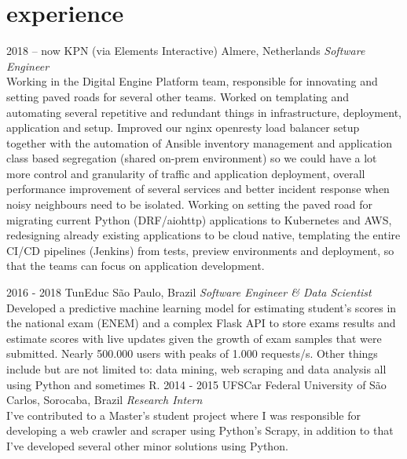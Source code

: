 \documentclass[]{friggeri-cv}
\begin{document}
\section{experience}

\begin{entrylist}
	\entry
		{2018 -- now}
		{KPN (via Elements Interactive)}
		{Almere, Netherlands}
		{\emph{Software Engineer}\\
		Working in the Digital Engine Platform team, responsible for innovating and setting paved roads for several other teams. Worked on templating and automating several repetitive and redundant things in infrastructure, deployment, application and setup.
		Improved our nginx openresty load balancer setup together with the automation of Ansible inventory management and application class based segregation (shared on-prem environment) so we could have a lot more control and granularity of traffic and application deployment, overall performance improvement of several services and better incident response when noisy neighbours need to be isolated.
		Working on setting the paved road for migrating current Python (DRF/aiohttp) applications to Kubernetes and AWS, redesigning already existing applications to be cloud native, templating the entire CI/CD pipelines (Jenkins) from tests, preview environments and deployment, so that the teams can focus on application development.
		}

	\entry
		{2016 - 2018}
		{TunEduc}
		{São Paulo, Brazil}
		{\emph{Software Engineer \& Data Scientist}\\
		Developed a predictive machine learning model for estimating student's scores in the national exam (ENEM) and a complex Flask API to store exams results and estimate scores with live updates given the growth of exam samples that were submitted. Nearly 500.000 users with peaks of 1.000 requests/s. 
		Other things include but are not limited to: data mining, web scraping and data analysis all using Python and sometimes R.
		}
	\entry
		{2014 - 2015}
		{UFSCar}
		{Federal University of São Carlos, Sorocaba, Brazil}
		{\emph{Research Intern}\\
		I've contributed to a Master's student project where I was responsible for developing a web crawler and scraper using Python's Scrapy, in addition to that I've developed several other minor solutions using Python. 
		}
		
\end{entrylist}
\end{document}
